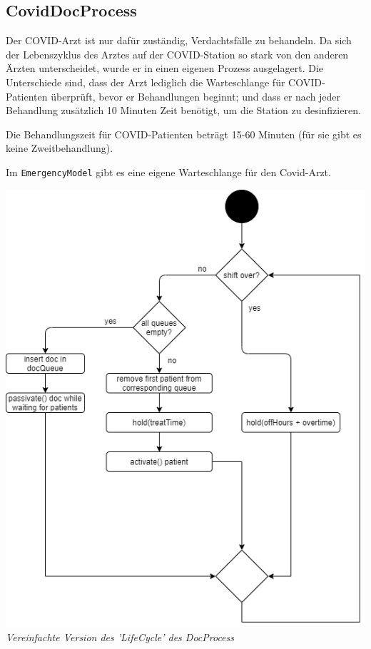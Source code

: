 \documentclass{article}
\begin{document}
\subsection{CovidDocProcess}

Der COVID-Arzt ist nur dafür zuständig, Verdachtsfälle zu behandeln.
Da sich der Lebenszyklus des Arztes auf der COVID-Station so stark von den anderen Ärzten unterscheidet,
wurde er in einen eigenen Prozess ausgelagert.
Die Unterschiede sind, dass der Arzt lediglich die Warteschlange für COVID-Patienten überprüft, bevor er Behandlungen beginnt; und dass er nach jeder Behandlung zusätzlich 10 Minuten Zeit benötigt, um die Station zu desinfizieren.

Die Behandlungszeit für COVID-Patienten beträgt 15-60 Minuten (für sie gibt es keine Zweitbehandlung).

Im \texttt{EmergencyModel} gibt es eine eigene Warteschlange für den Covid-Arzt.

\includegraphics[width=\textwidth]{img/docProcess.png}
\textit{Vereinfachte Version des 'LifeCycle' des DocProcess}
\end{document}
